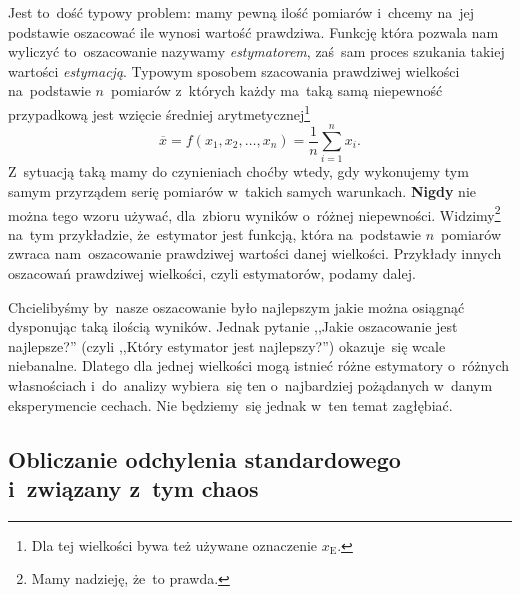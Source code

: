 \documentclass[a4paper,11pt]{article}
\newcommand{\ld}{\ldots}
\begin{document}
Jest to~dość typowy problem: mamy pewną ilość pomiarów i~chcemy na~jej
podstawie oszacować ile wynosi wartość prawdziwa. Funkcję która
pozwala nam wyliczyć to~oszacowanie nazywamy \emph{estymatorem},
zaś~sam proces szukania takiej wartości \emph{estymacją}. Typowym
sposobem szacowania prawdziwej wielkości na~podstawie $n$~pomiarów
z~których każdy ma~taką samą niepewność przypadkową jest wzięcie
średniej arytmetycznej\footnote{Dla tej wielkości bywa też używane
  oznaczenie $x_{ \textrm{E} }$.}
\begin{equation}
  \label{eq:3}
  \overline{ x } = f( x_{ 1 }, x_{ 2 }, \ld, x_{ n } )
  = \frac{ 1 }{ n } \sum_{ i = 1 }^{ n } x_{ i }.
\end{equation}
Z~sytuacją taką mamy do czynieniach choćby wtedy, gdy wykonujemy tym
samym przyrządem serię pomiarów w~takich samych warunkach.
\textbf{Nigdy} nie można tego wzoru używać, dla~zbioru wyników
o~różnej niepewności. Widzimy\footnote{Mamy nadzieję, że~to prawda.}
na~tym przykładzie, że~estymator jest funkcją, która na~podstawie
$n$~pomiarów zwraca nam~oszacowanie prawdziwej wartości danej
wielkości. Przykłady innych oszacowań prawdziwej wielkości, czyli
estymatorów, podamy dalej.

Chcielibyśmy by~nasze oszacowanie było najlepszym jakie można osiągnąć
dysponując taką ilością wyników. Jednak pytanie ,,Jakie oszacowanie
jest najlepsze?'' (czyli ,,Który estymator jest najlepszy?'')
okazuje~się wcale niebanalne. Dlatego dla jednej wielkości mogą
istnieć różne estymatory o~różnych własnościach i~do~analizy
wybiera~się ten o~najbardziej pożądanych w~danym eksperymencie
cechach. Nie będziemy~się jednak w~ten temat zagłębiać.





\subsection{Obliczanie odchylenia standardowego i~związany z~tym
  chaos}
\label{sec:obliczanie}
\end{document}
